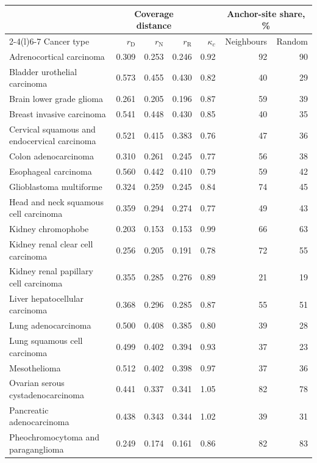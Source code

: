 \begin{table}[htbp]
\centering
\footnotesize
\renewcommand{\arraystretch}{1.1}
\begin{tabular}{@{}lrrrrrr@{}}
\toprule
 & \multicolumn{3}{c}{Coverage distance} & & \multicolumn{2}{c}{Anchor-site share, \%} \\
\cmidrule(lr){2-4}\cmidrule(l){6-7}
Cancer type & $r_{\mathrm D}$ & $r_{\mathrm N}$ & $r_{\mathrm R}$ & $\kappa_c$ & Neighbours & Random \\
\midrule
Adrenocortical carcinoma & 0.309 & 0.253 & 0.246 & 0.92 & 92 & 90 \\
Bladder urothelial carcinoma & 0.573 & 0.455 & 0.430 & 0.82 & 40 & 29 \\
Brain lower grade glioma & 0.261 & 0.205 & 0.196 & 0.87 & 59 & 39 \\
Breast invasive carcinoma & 0.541 & 0.448 & 0.430 & 0.85 & 40 & 35 \\
Cervical squamous and endocervical carcinoma & 0.521 & 0.415 & 0.383 & 0.76 & 47 & 36 \\
Colon adenocarcinoma & 0.310 & 0.261 & 0.245 & 0.77 & 56 & 38 \\
Esophageal carcinoma & 0.560 & 0.442 & 0.410 & 0.79 & 59 & 42 \\
Glioblastoma multiforme & 0.324 & 0.259 & 0.245 & 0.84 & 74 & 45 \\
Head and neck squamous cell carcinoma & 0.359 & 0.294 & 0.274 & 0.77 & 49 & 43 \\
Kidney chromophobe & 0.203 & 0.153 & 0.153 & 0.99 & 66 & 63 \\
Kidney renal clear cell carcinoma & 0.256 & 0.205 & 0.191 & 0.78 & 72 & 55 \\
Kidney renal papillary cell carcinoma & 0.355 & 0.285 & 0.276 & 0.89 & 21 & 19 \\
Liver hepatocellular carcinoma & 0.368 & 0.296 & 0.285 & 0.87 & 55 & 51 \\
Lung adenocarcinoma & 0.500 & 0.408 & 0.385 & 0.80 & 39 & 28 \\
Lung squamous cell carcinoma & 0.499 & 0.402 & 0.394 & 0.93 & 37 & 23 \\
Mesothelioma & 0.512 & 0.402 & 0.398 & 0.97 & 37 & 36 \\
Ovarian serous cystadenocarcinoma & 0.441 & 0.337 & 0.341 & 1.05 & 82 & 78 \\
Pancreatic adenocarcinoma & 0.438 & 0.343 & 0.344 & 1.02 & 39 & 31 \\
Pheochromocytoma and paraganglioma & 0.249 & 0.174 & 0.161 & 0.86 & 82 & 83 \\

\end{tabular}
\end{table}

